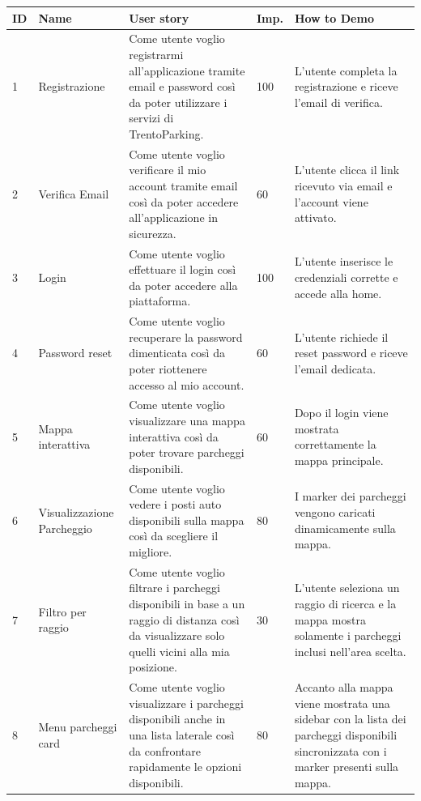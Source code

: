 \documentclass[12pt,a4paper]{article}
\begin{document}
\begin{longtable}{|p{0.7cm}|p{2.5cm}|p{5.8cm}|p{1.3cm}|p{4.2cm}|}
\hline
\textbf{ID} & \textbf{Name} & \textbf{User story} & \textbf{Imp.} & \textbf{How to Demo} \\
\hline
1 & Registrazione &
Come utente voglio registrarmi all'applicazione tramite email e password così da poter utilizzare i servizi di TrentoParking. &
100 &
L'utente completa la registrazione e riceve l'email di verifica. \\
\hline

2 & Verifica Email &
Come utente voglio verificare il mio account tramite email così da poter accedere all'applicazione in sicurezza. &
60 &
L'utente clicca il link ricevuto via email e l'account viene attivato. \\
\hline

3 & Login &
Come utente voglio effettuare il login così da poter accedere alla piattaforma. &
100 &
L'utente inserisce le credenziali corrette e accede alla home. \\
\hline

4 & Password reset &
Come utente voglio recuperare la password dimenticata così da poter riottenere accesso al mio account. &
60 &
L'utente richiede il reset password e riceve l'email dedicata. \\
\hline

5 & Mappa interattiva &
Come utente voglio visualizzare una mappa interattiva così da poter trovare parcheggi disponibili. &
60 &
Dopo il login viene mostrata correttamente la mappa principale. \\
\hline

6 & Visualizzazione Parcheggio &
Come utente voglio vedere i posti auto disponibili sulla mappa così da scegliere il migliore. &
80 &
I marker dei parcheggi vengono caricati dinamicamente sulla mappa. \\
\hline

7 & Filtro per raggio &
Come utente voglio filtrare i parcheggi disponibili in base a un raggio di distanza così da visualizzare solo quelli vicini alla mia posizione. &
30 &
L'utente seleziona un raggio di ricerca e la mappa mostra solamente i parcheggi inclusi nell'area scelta. \\
\hline

8 & Menu parcheggi card &
Come utente voglio visualizzare i parcheggi disponibili anche in una lista laterale così da confrontare rapidamente le opzioni disponibili. &
80 &
Accanto alla mappa viene mostrata una sidebar con la lista dei parcheggi disponibili sincronizzata con i marker presenti sulla mappa. \\
\hline


\end{longtable}
\end{document}
